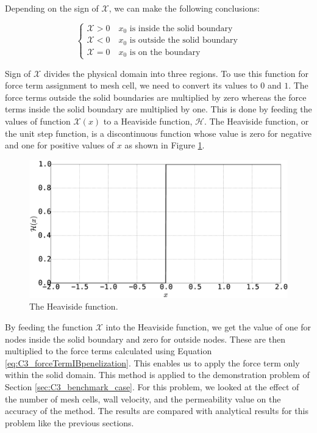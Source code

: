 Depending on the sign of $\mathcal{X}$, we can make the following conclusions:

\begin{equation}
\begin{cases}
    \mathcal{X} > 0 \quad \text{$x_0$ is inside the solid boundary} \\
    \mathcal{X} < 0 \quad \text{$x_0$ is outside the solid boundary} \\
    \mathcal{X} = 0 \quad \text{$x_0$ is on the boundary}
\end{cases}
\end{equation}

Sign of $\mathcal{X}$ divides the physical domain into three regions. To use this function for force term assignment to mesh cell, we need to convert its values to $0$ and $1$. The force terms outside the solid boundaries are multiplied by zero whereas the force terms inside the solid boundary are multiplied by one. This is done by feeding the values of function $\mathcal{X}(x)$ to a Heaviside function, $\mathcal{H}$. The Heaviside function, or the unit step function, is a discontinuous function whose value is zero for negative and one for positive values of $x$ as shown in Figure \ref{fig:C3_heavisideFunction}.

\begin{figure}[H]
    \centering
    \includegraphics[width=14.cm]{Chapter_3/figure/Heaviside_Function.eps}
    \caption{The Heaviside function.}
    \label{fig:C3_heavisideFunction}
\end{figure}

By feeding the function $\mathcal{X}$ into the Heaviside function, we get the value of one for nodes inside the solid boundary and zero for outside nodes. These are then multiplied to the force terms calculated using Equation \eqref{eq:C3_forceTermIBpenelization}. This enables us to apply the force term only within the solid domain. This method is applied to the demonstration problem of Section \ref{sec:C3_benchmark_case}. For this problem, we looked at the effect of the number of mesh cells, wall velocity, and the permeability value on the accuracy of the method. The results are compared with analytical results for this problem like the previous sections.

